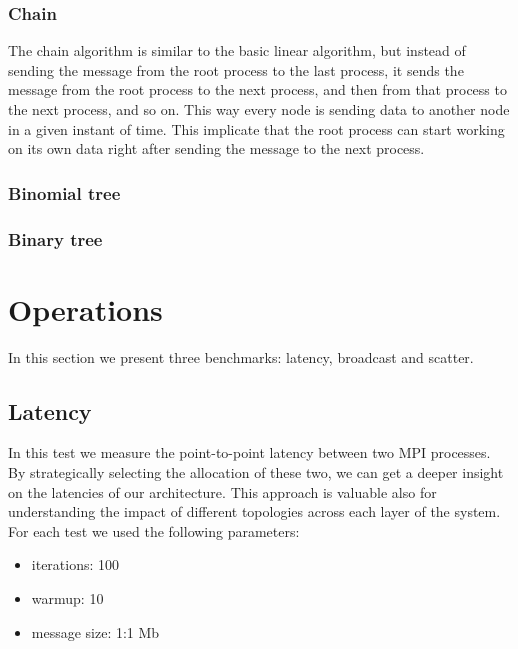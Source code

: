 \subsubsection{Chain}
    The chain algorithm is similar to the basic linear algorithm, but
    instead of sending the message from the root process to the last
    process, it sends the message from the root process to the next
    process, and then from that process to the next process, and so on.
    This way every node is sending data to another node in a given
    instant of time. This implicate that the root process can start
    working on its own data right after sending the message to the
    next process.
\subsubsection{Binomial tree}
\subsubsection{Binary tree}

\section{Operations}
    In this section we present three benchmarks: latency, broadcast
    and scatter. 

\subsection{Latency}
    In this test we measure the point-to-point latency between two MPI
    processes. By strategically selecting the allocation of these two,
    we can get a deeper insight on the latencies of our architecture.
    This approach is valuable also for understanding the impact
    of different topologies across each layer of the system.
    For each test we used the following parameters:
    \begin{itemize}
        \item iterations: 100
        \item warmup: 10
        \item message size: 1:1 Mb
    \end{itemize}

